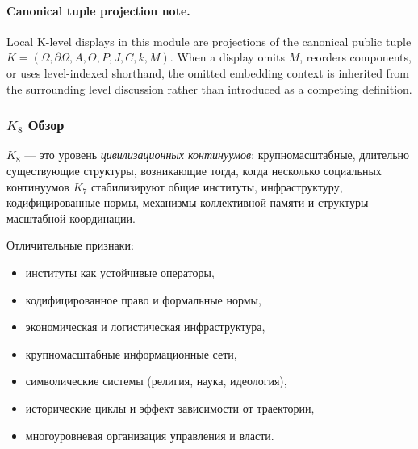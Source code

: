 



\paragraph{Canonical tuple projection note.}
Local K-level displays in this module are projections of the canonical public tuple \(K=(\Omega,\partial\Omega,A,\Theta,P,J,C,k,M)\). When a display omits \(M\), reorders components, or uses level-indexed shorthand, the omitted embedding context is inherited from the surrounding level discussion rather than introduced as a competing definition.

\subsubsection{\texorpdfstring{$K_8$}{K_8} Обзор}
\label{sec:k8-overview}

$K_8$ — это уровень \emph{цивилизационных континуумов}: крупномасштабные,
длительно существующие структуры, возникающие тогда, когда несколько социальных
континуумов $K_7$ стабилизируют общие институты, инфраструктуру, кодифицированные
нормы, механизмы коллективной памяти и структуры масштабной координации.

Отличительные признаки:
\begin{itemize}
    \item институты как устойчивые операторы,
    \item кодифицированное право и формальные нормы,
    \item экономическая и логистическая инфраструктура,
    \item крупномасштабные информационные сети,
    \item символические системы (религия, наука, идеология),
    \item исторические циклы и эффект зависимости от траектории,
    \item многоуровневая организация управления и власти.
\end{itemize}

